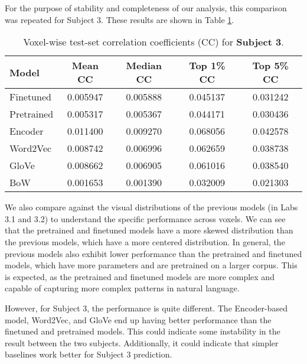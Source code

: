\documentclass[10pt,letterpaper]{article}
\begin{document}
For the purpose of stability and completeness of our analysis, this comparison was repeated for Subject 3. These results are shown in Table \ref{tab:cc_subject3_full}.



\begin{table}[ht]
\centering
\caption{Voxel-wise test-set correlation coefficients (CC) for \textbf{Subject 3}.}
\label{tab:cc_subject3_full}
\begin{tabular}{lcccc}
\toprule
\textbf{Model} &
\textbf{Mean CC} &
\textbf{Median CC} &
\textbf{Top 1\% CC} &
\textbf{Top 5\% CC} \\
\midrule
Finetuned  & 0.005947 & 0.005888 & 0.045137 & 0.031242 \\
Pretrained & 0.005317 & 0.005367 & 0.044171 & 0.030436 \\
Encoder    & 0.011400 & 0.009270 & 0.068056 & 0.042578 \\
Word2Vec   & 0.008742 & 0.006996 & 0.062659 & 0.038738 \\
GloVe      & 0.008662 & 0.006905 & 0.061016 & 0.038540 \\
BoW        & 0.001653 & 0.001390 & 0.032009 & 0.021303 \\
\bottomrule
\end{tabular}
\end{table}


We also compare against the visual distributions of the previous models (in Labs 3.1 and 3.2) to understand the specific performance across voxels. We can see that the pretrained and finetuned models have a more skewed distribution than the previous models, which have a more centered distribution. In general, the previous models also exhibit lower performance than the pretrained and finetuned models, which have more parameters and are pretrained on a larger corpus. This is expected, as the pretrained and finetuned models are more complex and capable of capturing more complex patterns in natural language.

However, for Subject 3, the performance is quite different. The Encoder-based model, Word2Vec, and GloVe end up having better performance than the finetuned and pretrained models. This could indicate some instability in the result between the two subjects. Additionally, it could indicate that simpler baselines work better for Subject 3 prediction.
\end{document}
